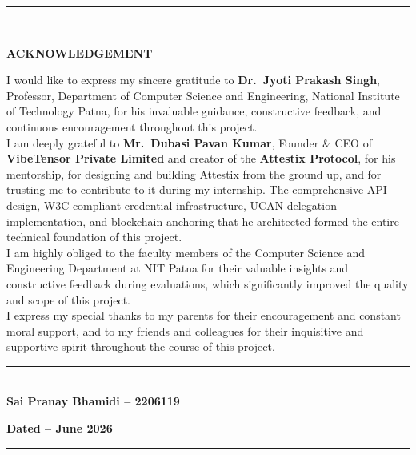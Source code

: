 \pagebreak
{}
\cleardoublepage


\vspace*{-\topskip}
\rule{\linewidth}{2pt} \\
\vspace{0.1in}
\begin{center}
{\bf \Large ACKNOWLEDGEMENT }\\
\par\vspace{5mm}
\end{center}
{\normalsize
\noindent I would like to express my sincere gratitude to \textbf{Dr.\ Jyoti Prakash Singh}, Professor, Department of Computer Science and Engineering, National Institute of Technology Patna, for his invaluable guidance, constructive feedback, and continuous encouragement throughout this project.\\[0.1in]

\noindent I am deeply grateful to \textbf{Mr.\ Dubasi Pavan Kumar}, Founder \& CEO of \textbf{VibeTensor Private Limited} and creator of the \textbf{Attestix Protocol}, for his mentorship, for designing and building Attestix from the ground up, and for trusting me to contribute to it during my internship. The comprehensive API design, W3C-compliant credential infrastructure, UCAN delegation implementation, and blockchain anchoring that he architected formed the entire technical foundation of this project.\\[0.1in]

\noindent I am highly obliged to the faculty members of the Computer Science and Engineering Department at NIT Patna for their valuable insights and constructive feedback during evaluations, which significantly improved the quality and scope of this project.\\[0.1in]

\noindent I express my special thanks to my parents for their encouragement and constant moral support, and to my friends and colleagues for their inquisitive and supportive spirit throughout the course of this project.\\[0.1in]
}

\begin{flushleft}
\vspace{8mm}
\rule{6cm}{0.15mm} \\
\textbf{Sai Pranay Bhamidi -- 2206119}
\vspace{20mm}

\textbf{Dated -- June 2026}

\end{flushleft}

\vfill
\rule{\linewidth}{2pt}
